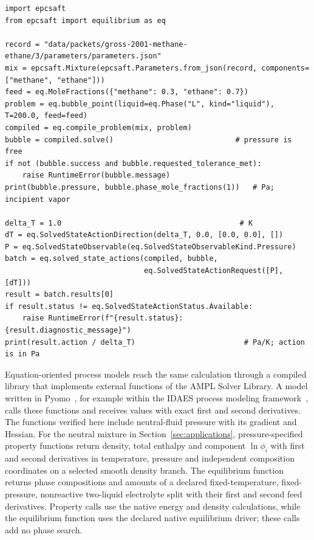 \noindent\begin{minipage}{\linewidth}
\begin{lstlisting}[caption={A bubble point and its exact temperature derivative.},label={lst:example}]
import epcsaft
from epcsaft import equilibrium as eq

record = "data/packets/gross-2001-methane-ethane/3/parameters/parameters.json"
mix = epcsaft.Mixture(epcsaft.Parameters.from_json(record, components=["methane", "ethane"]))
feed = eq.MoleFractions({"methane": 0.3, "ethane": 0.7})
problem = eq.bubble_point(liquid=eq.Phase("L", kind="liquid"), T=200.0, feed=feed)
compiled = eq.compile_problem(mix, problem)
bubble = compiled.solve()                            # pressure is free
if not (bubble.success and bubble.requested_tolerance_met):
    raise RuntimeError(bubble.message)
print(bubble.pressure, bubble.phase_mole_fractions(1))   # Pa; incipient vapor

delta_T = 1.0                                         # K
dT = eq.SolvedStateActionDirection(delta_T, 0.0, [0.0, 0.0], [])
P = eq.SolvedStateObservable(eq.SolvedStateObservableKind.Pressure)
batch = eq.solved_state_actions(compiled, bubble,
                                eq.SolvedStateActionRequest([P], [dT]))
result = batch.results[0]
if result.status != eq.SolvedStateActionStatus.Available:
    raise RuntimeError(f"{result.status}: {result.diagnostic_message}")
print(result.action / delta_T)                         # Pa/K; action is in Pa
\end{lstlisting}
\end{minipage}

Equation-oriented process models reach the same calculation through a compiled library that implements external functions of the AMPL Solver Library.
A model written in Pyomo~\citep{hartPyomoModelingSolving2011}, for example within the IDAES process modeling framework~\citep{leeIDAESProcessModeling2021}, calls these functions and receives values with exact first and second derivatives.
The functions verified here include neutral-fluid pressure with its gradient and Hessian.
For the neutral mixture in Section~\ref{sec:applications}, pressure-specified property functions return density, total enthalpy and component $\ln\phi_i$ with first and second derivatives in temperature, pressure and independent composition coordinates on a selected smooth density branch.
The equilibrium function returns phase compositions and amounts of a declared fixed-temperature, fixed-pressure, nonreactive two-liquid electrolyte split with their first and second feed derivatives.
Property calls use the native energy and density calculations, while the equilibrium function uses the declared native equilibrium driver; these calls add no phase search.

